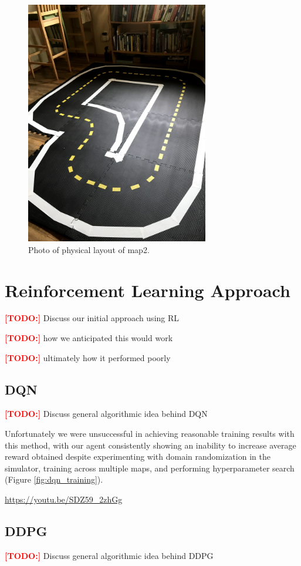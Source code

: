 \documentclass{article}
\newcommand\todo{\textcolor{red}{\textbf{[TODO:] }}}
\begin{document}
\begin{figure}[H]
\includegraphics[angle=270,width=8cm,keepaspectratio]{map2_real}
\centering
\caption{Photo of physical layout of map2.}
\label{fig:map2_real}
\end{figure}

\section{Reinforcement Learning Approach}
\todo Discuss our initial approach using RL

\todo how we anticipated this would work

\todo ultimately how it performed poorly

\subsection{DQN}
\todo Discuss general algorithmic idea behind DQN

Unfortunately we were unsuccessful in achieving reasonable training results with this method, with our agent consistently showing an inability to increase average reward obtained despite experimenting with domain randomization in the simulator, training across multiple maps, and performing hyperparameter search (Figure \ref{fig:dqn_training}).

\url{https://youtu.be/SDZ59_2zhGg}

\subsection{DDPG}
\todo Discuss general algorithmic idea behind DDPG
\end{document}
